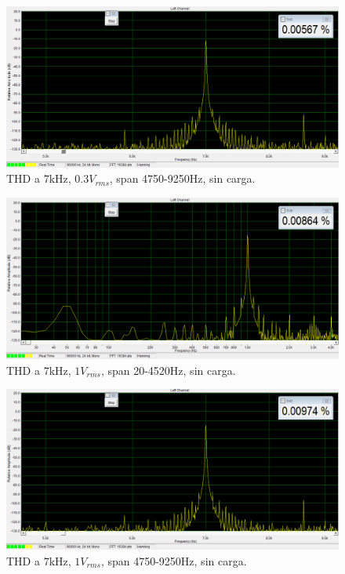 \begin{figure}[H]
\centering
\includegraphics[width=\textwidth]{img/Distorsion/THD_7k_03V_span_4750_9250.png}
\caption{THD a 7kHz, $0.3V_{rms}$, span 4750-9250Hz, sin carga.}
\label{THD2} 
\end{figure}

\begin{figure}[H]
\centering
\includegraphics[width=\textwidth]{img/Distorsion/THD_1k_1V_span_20_4520.png}
\caption{THD a 7kHz, $1V_{rms}$, span 20-4520Hz, sin carga.}
\label{THD3} 
\end{figure}

\begin{figure}[H]
\centering
\includegraphics[width=\textwidth]{img/Distorsion/THD_7k_1V_span_4750_9250.png}
\caption{THD a 7kHz, $1V_{rms}$, span 4750-9250Hz, sin carga.}
\label{THD4} 
\end{figure}

